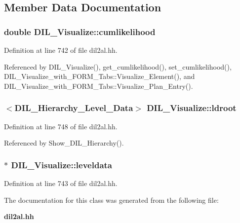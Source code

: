 \subsection{Member Data Documentation}
\subsubsection{\setlength{\rightskip}{0pt plus 5cm}double DIL\_\-Visualize::cumlikelihood\hspace{0.3cm}{\tt  [protected]}}\label{classDIL__Visualize_n0}




Definition at line 742 of file dil2al.hh.

Referenced by DIL\_\-Visualize(), get\_\-cumlikelihood(), set\_\-cumlikelihood(), DIL\_\-Visualize\_\-with\_\-FORM\_\-Tabs::Visualize\_\-Element(), and DIL\_\-Visualize\_\-with\_\-FORM\_\-Tabs::Visualize\_\-Plan\_\-Entry().
\subsubsection{$<${\bf DIL\_\-Hierarchy\_\-Level\_\-Data}$>$ DIL\_\-Visualize::ldroot}\label{classDIL__Visualize_m0}




Definition at line 748 of file dil2al.hh.

Referenced by Show\_\-DIL\_\-Hierarchy().
\subsubsection{$\ast$ DIL\_\-Visualize::leveldata\hspace{0.3cm}{\tt  [protected]}}\label{classDIL__Visualize_n1}




Definition at line 743 of file dil2al.hh.

The documentation for this class was generated from the following file:\begin{CompactItemize}
\item 
{\bf dil2al.hh}\end{CompactItemize}
